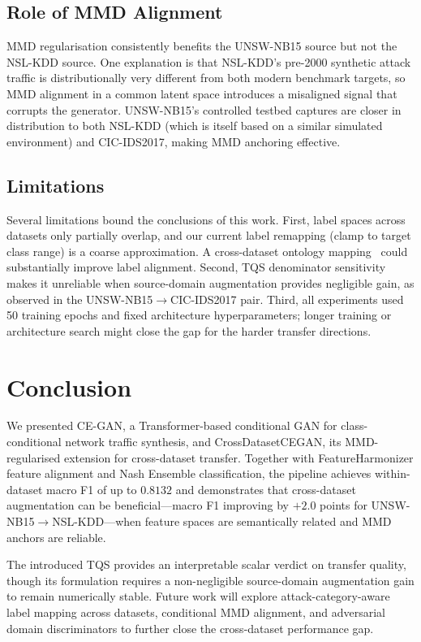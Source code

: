 \documentclass[conference]{IEEEtran}
\begin{document}
\subsection{Role of MMD Alignment}

MMD regularisation consistently benefits the UNSW-NB15 source
but not the NSL-KDD source.
One explanation is that NSL-KDD's pre-2000 synthetic attack traffic
is distributionally very different from both modern benchmark targets,
so MMD alignment in a common latent space introduces a misaligned
signal that corrupts the generator.
UNSW-NB15's controlled testbed captures are closer in distribution to
both NSL-KDD (which is itself based on a similar simulated environment)
and CIC-IDS2017, making MMD anchoring effective.

\subsection{Limitations}

Several limitations bound the conclusions of this work.
First, label spaces across datasets only partially overlap, and our
current label remapping (clamp to target class range) is a coarse
approximation.
A cross-dataset ontology mapping~\cite{ring2019survey} could
substantially improve label alignment.
Second, TQS denominator sensitivity makes it unreliable when
source-domain augmentation provides negligible gain, as observed
in the UNSW-NB15$\to$CIC-IDS2017 pair.
Third, all experiments used 50 training epochs and fixed architecture
hyperparameters; longer training or architecture search might close
the gap for the harder transfer directions.

\section{Conclusion}

We presented CE-GAN, a Transformer-based conditional GAN for
class-conditional network traffic synthesis, and CrossDatasetCEGAN,
its MMD-regularised extension for cross-dataset transfer.
Together with FeatureHarmonizer feature alignment and Nash Ensemble
classification, the pipeline achieves within-dataset macro F1 of up to
$0.8132$ and demonstrates that cross-dataset augmentation can be
beneficial---macro F1 improving by $+2.0$ points for
UNSW-NB15$\to$NSL-KDD---when feature spaces are semantically related
and MMD anchors are reliable.

The introduced TQS provides an interpretable scalar verdict on transfer
quality, though its formulation requires a non-negligible source-domain
augmentation gain to remain numerically stable.
Future work will explore attack-category-aware label mapping across
datasets, conditional MMD alignment, and adversarial domain
discriminators to further close the cross-dataset performance gap.
\end{document}

